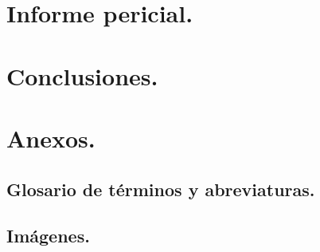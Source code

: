 \documentclass[12pt,a4paper]{report}
\begin{document}
\chapter{Informe pericial.}

\clearpage

\chapter{Conclusiones.}

\clearpage

\chapter{Anexos.}

\clearpage

\section{Glosario de términos y abreviaturas.}

\clearpage

\section{Imágenes.}

\clearpage



\clearpage
\end{document}
